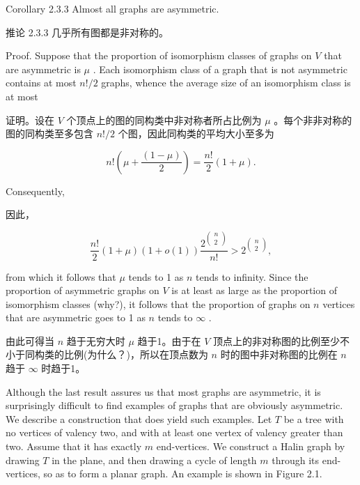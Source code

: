 \documentclass[10pt]{article}
\begin{document}
Corollary 2.3.3 Almost all graphs are asymmetric.

\begin{tcolorbox}\relax
推论 2.3.3 几乎所有图都是非对称的。
\end{tcolorbox}

Proof. Suppose that the proportion of isomorphism classes of graphs on \(V\) that are asymmetric is \(\mu\) . Each isomorphism class of a graph that is not asymmetric contains at most \(n!/2\) graphs, whence the average size of an isomorphism class is at most

\begin{tcolorbox}\relax
证明。设在 \(V\) 个顶点上的图的同构类中非对称者所占比例为 \(\mu\) 。每个非非对称的图的同构类至多包含 \(n!/2\) 个图，因此同构类的平均大小至多为
\end{tcolorbox}

\[
n!\left( {\mu  + \frac{\left( 1 - \mu \right) }{2}}\right)  = \frac{n!}{2}\left( {1 + \mu }\right) .
\]

Consequently,

\begin{tcolorbox}\relax
因此，
\end{tcolorbox}

\[
\frac{n!}{2}\left( {1 + \mu }\right) \left( {1 + o\left( 1\right) }\right) \frac{{2}^{\left( \begin{matrix} n \\  2 \end{matrix}\right) }}{n!} > {2}^{\left( \begin{matrix} n \\  2 \end{matrix}\right) },
\]

from which it follows that \(\mu\) tends to 1 as \(n\) tends to infinity. Since the proportion of asymmetric graphs on \(V\) is at least as large as the proportion of isomorphism classes (why?), it follows that the proportion of graphs on \(n\) vertices that are asymmetric goes to 1 as \(n\) tends to \(\infty\) .

\begin{tcolorbox}\relax
由此可得当 \(n\) 趋于无穷大时 \(\mu\) 趋于1。由于在 \(V\) 顶点上的非对称图的比例至少不小于同构类的比例(为什么？)，所以在顶点数为 \(n\) 时的图中非对称图的比例在 \(n\) 趋于 \(\infty\) 时趋于1。
\end{tcolorbox}

Although the last result assures us that most graphs are asymmetric, it is surprisingly difficult to find examples of graphs that are obviously asymmetric. We describe a construction that does yield such examples. Let \(T\) be a tree with no vertices of valency two, and with at least one vertex of valency greater than two. Assume that it has exactly \(m\) end-vertices. We construct a Halin graph by drawing \(T\) in the plane, and then drawing a cycle of length \(m\) through its end-vertices, so as to form a planar graph. An example is shown in Figure 2.1.
\end{document}
